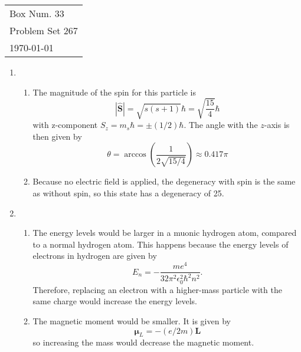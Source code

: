 \documentclass[10pt]{article}
\renewcommand{\vec}{\mathbf}
\begin{document}
  \begin{tabular}{l}
    Box Num. 33 \\
    Problem Set 267 \\
    \today
  \end{tabular}

  \begin{enumerate}
    \item \begin{enumerate}
        \item The magnitude of the spin for this particle is
        \begin{equation*}
            |\hat{\vec{S}}| = \sqrt{s(s+1)}\hbar = \sqrt{\frac{15}{4}}\hbar
        \end{equation*}
        with z-component $S_z = m_s\hbar = \pm(1/2)\hbar$. The angle with the $z$-axis is then given by
        \begin{equation*}
            \theta = \arccos \left(\frac{1}{2\sqrt{15/4}}\right) \approx 0.417\pi
        \end{equation*}

        \item Because no electric field is applied, the degeneracy with spin is the same as without spin, so this state has a degeneracy of 25.
    \end{enumerate}

    \item \begin{enumerate}
        \item The energy levels would be larger in a muonic hydrogen atom, compared to a normal hydrogen atom. This happens because the energy levels of electrons in hydrogen are given by
        \begin{equation*}
            E_n = -\frac{me^4}{32\pi^2\epsilon_0^2\hbar^2n^2}.
        \end{equation*}
        Therefore, replacing an electron with a higher-mass particle with the same charge would increase the energy levels.

        \item The magnetic moment would be smaller. It is given by
        \begin{equation*}
            \mathbf{\mu}_L = -(e/2m)\vec{L}
        \end{equation*}
        so increasing the mass would decrease the magnetic moment.
    \end{enumerate}


\end{enumerate}
\end{document}
